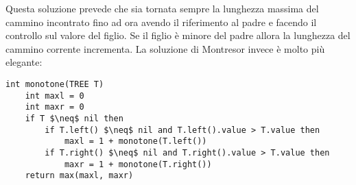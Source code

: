 \documentclass[../cheatSheetAlgoritmi.tex]{subfiles}
\begin{document}
Questa soluzione prevede che sia tornata sempre la lunghezza massima del cammino incontrato fino ad ora avendo il riferimento al padre e facendo il controllo sul valore del figlio. Se il figlio è minore del padre allora la lunghezza del cammino corrente incrementa.
La soluzione di Montresor invece è molto più elegante:
\begin{lstlisting}[caption=Percorso cammino-discendente Montresor]
int monotone(TREE T)
	int maxl = 0
	int maxr = 0
	if T $\neq$ nil then
		if T.left() $\neq$ nil and T.left().value > T.value then
			maxl = 1 + monotone(T.left())
		if T.right() $\neq$ nil and T.right().value > T.value then
			maxr = 1 + monotone(T.right())
	return max(maxl, maxr)
\end{lstlisting}

 
\end{document}
